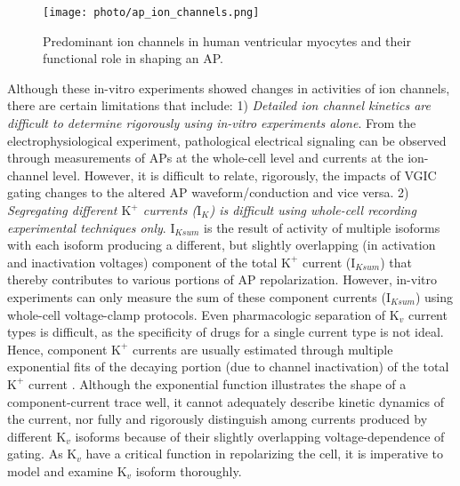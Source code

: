\documentclass[journal]{IEEEtran}
\begin{document}
\begin{figure}
    \label{fig2}
    \centering
    \texttt{[image: photo/ap\_ion\_channels.png]}
    \caption{Predominant ion channels in human ventricular myocytes and their functional role in shaping an AP.}
    \label{fig:my_label}
\end{figure}

Although these in-vitro experiments showed changes in activities of ion channels, there are certain limitations that include: 1) \textit{Detailed ion channel kinetics are difficult to determine rigorously using in-vitro experiments alone}. From the electrophysiological experiment, pathological electrical signaling can be observed through measurements of APs at the whole-cell level and currents at the ion-channel level. However, it is difficult to relate, rigorously, the impacts of VGIC gating changes to the altered AP waveform/conduction and vice versa. 2) \textit{Segregating different $\text{K}^{+}$ currents ($\text{I}_{K}$) is difficult using whole-cell recording experimental techniques only}. $\text{I}_{Ksum}$ is the result of activity of multiple isoforms with each isoform producing a different, but slightly overlapping (in activation and inactivation voltages) component of the total $\text{K}^{+}$ current ($\text{I}_{Ksum}$) \cite{du2017} that thereby contributes to various portions of AP repolarization. However, in-vitro experiments can only measure the sum of these component currents ($\text{I}_{Ksum}$) using whole-cell voltage-clamp protocols. Even pharmacologic separation of $\text{K}_{v}$ current types is difficult, as the specificity of drugs for a single current type is not ideal. Hence, component $\text{K}^{+}$ currents are usually estimated through multiple exponential fits of the decaying portion (due to channel inactivation) of the total $\text{K}^{+}$ current \cite{brunet2004heterogeneous}. Although the exponential function illustrates the shape of a component-current trace well, it cannot adequately describe kinetic dynamics of the current, nor fully and rigorously distinguish among currents produced by different $\text{K}_{v}$ isoforms because of their slightly overlapping voltage-dependence of gating. As $\text{K}_{v}$ have a critical function in repolarizing the cell, it is imperative to model and examine $\text{K}_{v}$ isoform thoroughly.
\end{document}
